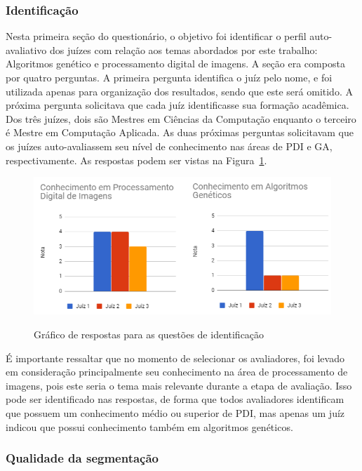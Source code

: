 \documentclass[12pt,oneside,a4paper,english,french,spanish,brazil,]{abntex2}
\begin{document}
\subsubsection{Identificação}

Nesta primeira seção do questionário, o objetivo foi identificar o perfil auto-avaliativo dos juízes com relação aos temas abordados por este trabalho: Algoritmos genético e processamento digital de imagens. A seção era composta por quatro perguntas. A primeira pergunta identifica o juíz pelo nome, e foi utilizada apenas para organização dos resultados, sendo que este será omitido. A próxima pergunta solicitava que cada juíz identificasse sua formação acadêmica. Dos três juízes, dois são Mestres em Ciências da Computação enquanto o terceiro é Mestre em Computação Aplicada. As duas próximas perguntas solicitavam que os juízes auto-avaliassem seu nível de conhecimento nas áreas de PDI e GA, respectivamente. As respostas podem ser vistas na Figura~\ref{fig:AJ_Perfil}.

\begin{figure}[ht]
\centering
\caption{Gráfico de respostas para as questões de identificação}
\includegraphics[width=1.0\textwidth]{imagens/Avaliacao_Juizes/Grafico_Perfil.png}
\sourceAuthor{}
\label{fig:AJ_Perfil}
\end{figure}

É importante ressaltar que no momento de selecionar os avaliadores, foi levado em consideração principalmente seu conhecimento na área de processamento de imagens, pois este seria o tema mais relevante durante a etapa de avaliação. Isso pode ser identificado nas respostas, de forma que todos avaliadores identificam que possuem um conhecimento médio ou superior de PDI, mas apenas um juíz indicou que possui conhecimento também em algoritmos genéticos.

\subsubsection{Qualidade da segmentação}
\end{document}
